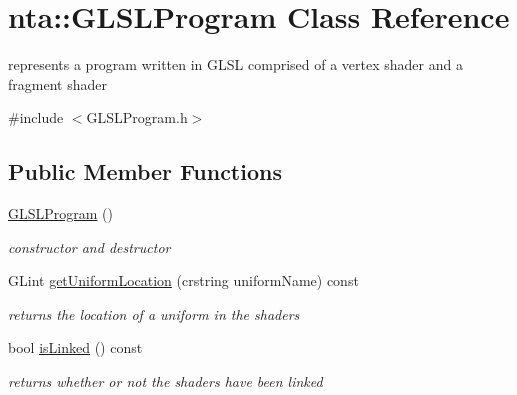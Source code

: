 \hypertarget{classnta_1_1GLSLProgram}{}\section{nta\+:\+:G\+L\+S\+L\+Program Class Reference}
\label{classnta_1_1GLSLProgram}


represents a program written in G\+L\+SL comprised of a vertex shader and a fragment shader  




{\ttfamily \#include $<$G\+L\+S\+L\+Program.\+h$>$}

\subsection*{Public Member Functions}
\begin{DoxyCompactItemize}
\item 
\mbox{\label{classnta_1_1GLSLProgram_ad8a89f518a3a6ecaa26125d3bbefafaa}} 
\hyperlink{classnta_1_1GLSLProgram_ad8a89f518a3a6ecaa26125d3bbefafaa}{G\+L\+S\+L\+Program} ()
\begin{DoxyCompactList}\small\item\em constructor and destructor \end{DoxyCompactList}\item 
\mbox{\label{classnta_1_1GLSLProgram_a8140edf8b3d89de4ebf8c4b1db404f59}} 
G\+Lint \hyperlink{classnta_1_1GLSLProgram_a8140edf8b3d89de4ebf8c4b1db404f59}{get\+Uniform\+Location} (crstring uniform\+Name) const
\begin{DoxyCompactList}\small\item\em returns the location of a uniform in the shaders \end{DoxyCompactList}\item 
\mbox{\label{classnta_1_1GLSLProgram_a6067e49c12b542735eff255047cd8ae1}} 
bool \hyperlink{classnta_1_1GLSLProgram_a6067e49c12b542735eff255047cd8ae1}{is\+Linked} () const
\begin{DoxyCompactList}\small\item\em returns whether or not the shaders have been linked \end{DoxyCompactList}\item 
\mbox{\label{classnta_1_1GLSLProgram_a708c47abebb9ca01b0eed4d1e711cef7}} 

\end{DoxyCompactItemize}
